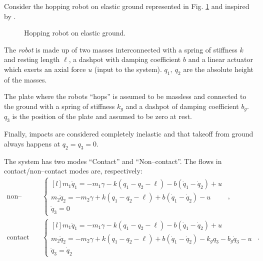 \begin{exmp}\label{ex:hopping}
    Consider the hopping robot on elastic ground represented in Fig. \ref{fig:hopping} and inspired by \cite{Ishikawa2003}.
    \begin{figure}[h]
        \centering
        
        \caption[Hopping robot on elastic ground]{Hopping robot on elastic ground. }
        \label{fig:hopping}
    \end{figure}
    The \textit{robot} is made up of two masses interconnected with a spring of stiffness $k$ and resting length $\ell$, a dashpot with damping coefficient $b$ and a linear actuator which exerts an axial force $u$ (input to the system). 
    $q_1,~q_2$ are the absolute height of the masses.
    
    The plate where the robots ``hops'' is assumed to be massless and connected to the ground with a spring of stiffness $k_g$ and a dashpot of damping coefficient $b_g$.
    $q_3$ is the position of the plate and assumed to be zero at rest.
    
    Finally, impacts are considered completely inelastic and that takeoff from ground always happens at $q_2 = q_3 = 0$.
    
    The system has two modes ``Contact'' and ``Non--contact''. The flows in contact/non--contact modes are, respectively:
    \begin{align}
        \text{non--contact}\quad
        &\left\{
            \begin{matrix*}[l]
            m_1\ddot{q}_1 = -m_1\gamma -k\left(q_1-q_2-\ell\right) -b\left(\dot{q}_1-\dot{q}_2\right) + u\\
            m_2\ddot{q}_2 = -m_2\gamma +k\left(q_1-q_2-\ell\right) +b\left(\dot{q}_1-\dot{q}_2\right) - u\\
            \ddot{q}_3 = 0
            \end{matrix*}
        \right.~~,\\
        \text{contact}\quad
        &\left\{
            \begin{matrix*}[l]
            m_1\ddot{q}_1 = -m_1\gamma -k\left(q_1-q_2-\ell\right) -b\left(\dot{q}_1-\dot{q}_2\right) + u\\
            m_2\ddot{q}_2 = -m_2\gamma +k\left(q_1-q_2-\ell\right) +b\left(\dot{q}_1-\dot{q}_2\right) - k_gq_3-b_g\dot{q}_3 - u\\
            \ddot{q}_3 = \dot{q}_2
            \end{matrix*}
        \right.~~.
    \end{align}
    

\end{exmp}

